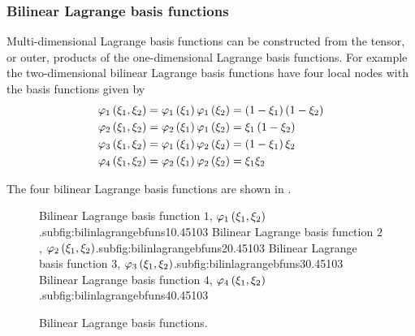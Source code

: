 \subsubsection{Bilinear Lagrange basis functions}

Multi-dimensional Lagrange basis functions can be constructed from the tensor,
or outer, products of the one-dimensional Lagrange basis functions. For
example the two-dimensional bilinear Lagrange basis functions have four local
nodes with the basis functions given by
\begin{equation}
  \begin{split}
       \varphi_{1} \left( \xi_{1},\xi_{2} \right)  &=   \varphi_{1} \left( \xi_{1} \right)     \varphi_{1} \left( \xi_{2} \right)  =
    \left( 1-\xi_{1} \right)\left( 1-\xi_{2} \right)\\
       \varphi_{2} \left( \xi_{1},\xi_{2} \right)  &=   \varphi_{2} \left( \xi_{1} \right)     \varphi_{1} \left( \xi_{2} \right)  =
    \xi_{1}\left( 1-\xi_{2} \right)\\
       \varphi_{3} \left( \xi_{1},\xi_{2} \right)  &=   \varphi_{1} \left( \xi_{1} \right)     \varphi_{2} \left( \xi_{2} \right)  =
    \left( 1-\xi_{1} \right)\xi_{2} \\
       \varphi_{4} \left( \xi_{1},\xi_{2} \right)  &=   \varphi_{2} \left( \xi_{1} \right)     \varphi_{2} \left( \xi_{2} \right)  =
    \xi_{1}\xi_{2}
  \end{split}
\end{equation}

The four \twodal bilinear Lagrange basis functions are shown in .


\begin{figure}[hbtp]
   \centering
     {Bilinear Lagrange basis function $1$, $   \varphi_{1} \left( \xi_{1},\xi_{2} \right)  $.}{subfig:bilinlagrangebfuns1}{0.45\linewidth}{10}{3}{}
   \hfil
     {Bilinear Lagrange basis function $2$, $   \varphi_{2} \left( \xi_{1},\xi_{2} \right)  $.}{subfig:bilinlagrangebfuns2}{0.45\linewidth}{10}{3}{}
     {Bilinear Lagrange basis function $3$, $   \varphi_{3} \left( \xi_{1},\xi_{2} \right)  $.}{subfig:bilinlagrangebfuns3}{0.45\linewidth}{10}{3}{}
   \hfil  
     {Bilinear Lagrange basis function $4$, $   \varphi_{4} \left( \xi_{1},\xi_{2} \right)  $.}{subfig:bilinlagrangebfuns4}{0.45\linewidth}{10}{3}{}
   \caption[Bilinear Lagrange basis functions.]{Bilinear Lagrange basis functions.}
   \label{fig:bilinlagrangebfuns}
\end{figure}
            
